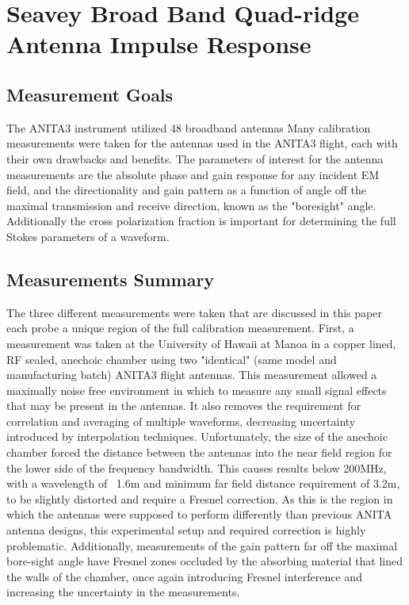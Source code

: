\section{Seavey Broad Band Quad-ridge Antenna Impulse Response}

	\subsection{Measurement Goals}

	The ANITA3 instrument utilized 48 broadband antennas 	Many calibration measurements were taken for the antennas used in the ANITA3 flight, each with their own drawbacks and benefits.  The parameters of interest for the antenna measurements are the absolute phase and gain response for any incident EM field, and the directionality and gain pattern as a function of angle off the maximal transmission and receive direction, known as the "boresight" angle.  Additionally the cross polarization fraction is important for determining the full Stokes parameters of a waveform.
	
	\subsection{Measurements Summary}
	
	The three different measurements were taken that are discussed in this paper each probe a unique region of the full calibration measurement.  First, a measurement was taken at the University of Hawaii at Manoa in a copper lined, RF sealed, anechoic chamber using two "identical" (same model and manufacturing batch) ANITA3 flight antennas.  This measurement allowed a maximally noise free environment in which to measure any small signal effects that may be present in the antennas.  It also removes the requirement for correlation and averaging of multiple waveforms, decreasing uncertainty introduced by interpolation techniques.  Unfortunately, the size of the anechoic chamber forced the distance between the antennas into the near field region for the lower side of the frequency bandwidth.  This causes results below 200MHz, with a wavelength of ~1.6m and minimum far field distance requirement of 3.2m, to be slightly distorted and require a 	Fresnel correction. As this is the region in which the antennas were supposed to perform differently than previous ANITA antenna designs, this experimental setup and required correction is highly problematic.  Additionally, measurements of the gain pattern far off the maximal bore-sight angle have Fresnel zones occluded by the absorbing material that lined the walls of the chamber, once again introducing Fresnel interference and increasing the uncertainty in the measurements.
	
